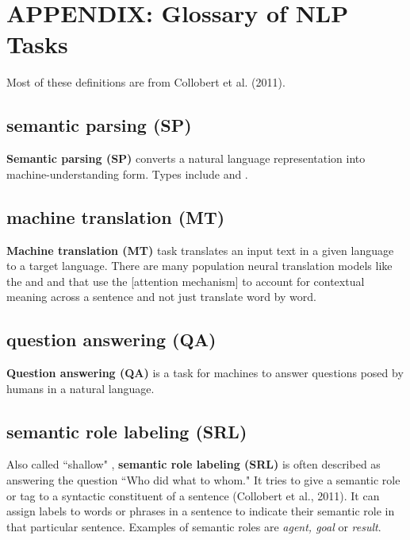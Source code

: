 \section{APPENDIX: Glossary of NLP Tasks} \label{app:Appendix_NLPTasks}

Most of these definitions are from Collobert et al. (2011). 


\subsection{semantic parsing (SP)} \label{nlptask:semanticparsingSP}

\textbf{Semantic parsing (SP)} converts a natural language representation into machine-understanding form. Types include  and .

\subsection{machine translation (MT)} \label{nlptask:machinetranslationMT}

\textbf{Machine translation (MT)} task translates an input text in a given language to a target language. There are many population neural translation models like the  and  and  that use the \hyperref[sec:AttentionMechanism][attention mechanism] to account for contextual meaning across a sentence and not just translate word by word. 


\subsection{question answering (QA)} \label{nlptask:questionansweringQA}

\textbf{Question answering (QA)} is a task for machines to answer questions posed by humans in a natural language. 


\subsection{semantic role labeling (SRL)} \label{nlptask:semanticrolelabelingSRL}

Also called ``shallow"  , \textbf{semantic role labeling (SRL)} is often described as answering the question ``Who did what to whom." It tries to give a semantic role or tag to a syntactic constituent of a sentence (Collobert et al., 2011). It can assign labels to words or phrases in a sentence to indicate their semantic role in that particular sentence. Examples of semantic roles are \emph{agent, goal} or \emph{result}. 

